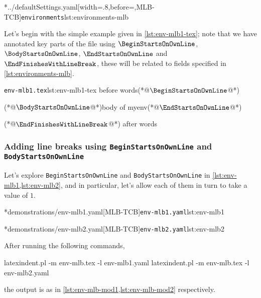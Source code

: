 	\cmhlistingsfromfile[style=modifylinebreaksEnv]*{../defaultSettings.yaml}[width=.8\linewidth,before=\centering,MLB-TCB]{\texttt{environments}}{lst:environments-mlb}

	Let's begin with the simple example given in \cref{lst:env-mlb1-tex}; note that we have annotated key parts of the file using $\BeginStartsOnOwnLine$, $\BodyStartsOnOwnLine$, $\EndStartsOnOwnLine$ and $\EndFinishesWithLineBreak$, these will be related to fields specified in \cref{lst:environments-mlb}.

	\begin{cmhlistings}[style=tcblatex,escapeinside={(*@}{@*)}]{\texttt{env-mlb1.tex}}{lst:env-mlb1-tex}
before words(*@$\BeginStartsOnOwnLine$@*) \begin{myenv}(*@$\BodyStartsOnOwnLine$@*)body of myenv(*@$\EndStartsOnOwnLine$@*)\end{myenv}(*@$\EndFinishesWithLineBreak$@*) after words
\end{cmhlistings}

\subsubsection[Adding line breaks: \texttt{BeginStartsOnOwnLine} and \texttt{BodyStartsOnOwnLine}]{Adding line breaks using \texttt{BeginStartsOnOwnLine} and \texttt{BodyStartsOnOwnLine}}
	Let's explore \texttt{BeginStartsOnOwnLine} and \texttt{BodyStartsOnOwnLine} in \cref{lst:env-mlb1,lst:env-mlb2}, and in particular, let's allow each of them in turn to take a value of $1$.

	\begin{minipage}{.45\textwidth}
		\cmhlistingsfromfile[style=yaml-LST]*{demonstrations/env-mlb1.yaml}[MLB-TCB]{\texttt{env-mlb1.yaml}}{lst:env-mlb1}
	\end{minipage}
	\hfill
	\begin{minipage}{.45\textwidth}
		\cmhlistingsfromfile[style=yaml-LST]*{demonstrations/env-mlb2.yaml}[MLB-TCB]{\texttt{env-mlb2.yaml}}{lst:env-mlb2}
	\end{minipage}

	After running the following commands, \begin{commandshell}
latexindent.pl -m env-mlb.tex -l env-mlb1.yaml
latexindent.pl -m env-mlb.tex -l env-mlb2.yaml
\end{commandshell} the output is as in \cref{lst:env-mlb-mod1,lst:env-mlb-mod2} respectively.

	\begin{widepage}
		\begin{minipage}{.56\linewidth}
		\end{minipage}
		\hfill
		\begin{minipage}{.43\linewidth}
		\end{minipage}
	\end{widepage}

